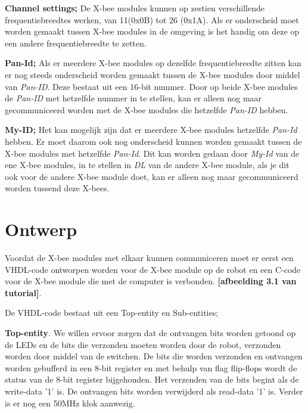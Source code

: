 \documentclass{report}
\begin{document}
\textbf{Channel settings;}
\newline
De X-bee modules kunnen op zestien verschillende frequentiebreedtes werken, van 11(0x0B) tot 26 (0x1A). Als er onderscheid moet worden gemaakt tussen X-bee modules in de omgeving is het handig om deze op een andere frequentiebreedte te zetten.
\newline

\textbf{Pan-Id;}
\newline
Als er meerdere X-bee modules op dezelfde frequentiebreedte zitten kan er nog steeds onderscheid worden gemaakt tussen de X-bee modules door middel van \textit{Pan-ID}. Deze bestaat uit een 16-bit nummer. Door op beide X-bee modules de \textit{Pan-ID}  met hetzelfde nummer in te stellen, kan er alleen nog maar gecommuniceerd worden met de X-bee modules die hetzelfde \textit{Pan-ID} hebben.
\newline

\textbf{My-ID;}
\newline
Het kan mogelijk zijn dat er meerdere X-bee modules hetzelfde\textit{ Pan-Id} hebben. Er moet daarom ook nog onderscheid kunnen worden gemaakt tussen de X-bee modules met hetzelfde \textit{Pan-Id}. Dit kan worden gedaan door \textit{My-Id} van de ene X-bee modules, in te stellen in \textit{DL} van de andere X-bee module, als je dit ook voor de andere X-bee module doet, kan er alleen nog maar gecommuniceerd worden tussend deze X-bees.


\section{Ontwerp}
Voordat de X-bee modules met elkaar kunnen communiceren moet er eerst een VHDL-code ontworpen worden voor de X-bee module op de robot en een C-code voor de X-bee module die met de computer is verbonden.
\textbf{[afbeelding 3.1 van tutorial]}.
\newline

De VHDL-code bestaat uit een Top-entity en Sub-entities;
\newline

\textbf{Top-entity}.
\newline
We willen ervoor zorgen dat de ontvangen bits worden getoond op de LEDs en de bits die verzonden moeten worden door de robot, verzonden worden door middel van de switchen. De bits die worden verzonden en ontvangen worden gebufferd in een 8-bit register en met behulp van flag flip-flops wordt de status van de 8-bit register bijgehouden. Het verzenden van de bits begint als de write-data '1' is. De ontvangen bits worden verwijderd als read-data '1' is. Verder is er nog een 50MHz klok aanwezig.
\newline
\end{document}
